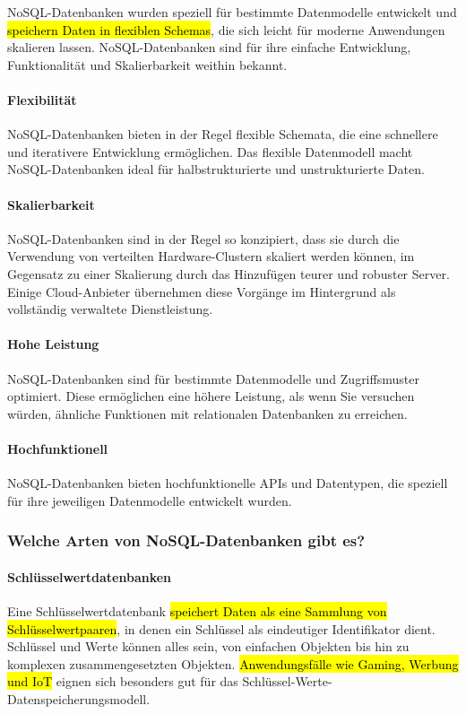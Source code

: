 NoSQL-Datenbanken wurden speziell für bestimmte Datenmodelle entwickelt und \hl{speichern Daten in flexiblen Schemas}, die sich leicht für moderne Anwendungen skalieren lassen. NoSQL-Datenbanken sind für ihre einfache Entwicklung, Funktionalität und Skalierbarkeit weithin bekannt. \cite{AWSnoSQL}

\paragraph{Flexibilität} NoSQL-Datenbanken bieten in der Regel flexible Schemata, die eine schnellere und iterativere Entwicklung ermöglichen. Das flexible Datenmodell macht NoSQL-Datenbanken ideal für halbstrukturierte und unstrukturierte Daten.

\paragraph{Skalierbarkeit} NoSQL-Datenbanken sind in der Regel so konzipiert, dass sie durch die Verwendung von verteilten Hardware-Clustern skaliert werden können, im Gegensatz zu einer Skalierung durch das Hinzufügen teurer und robuster Server. Einige Cloud-Anbieter übernehmen diese Vorgänge im Hintergrund als vollständig verwaltete Dienstleistung.

\paragraph{Hohe Leistung} NoSQL-Datenbanken sind für bestimmte Datenmodelle und Zugriffsmuster optimiert. Diese ermöglichen eine höhere Leistung, als wenn Sie versuchen würden, ähnliche Funktionen mit relationalen Datenbanken zu erreichen.

\paragraph{Hochfunktionell} NoSQL-Datenbanken bieten hochfunktionelle APIs und Datentypen, die speziell für ihre jeweiligen Datenmodelle entwickelt wurden.

\subsubsection{Welche Arten von NoSQL-Datenbanken gibt es?}
\label{sec:ArtenNoSQL}

\paragraph{Schlüsselwertdatenbanken} Eine Schlüsselwertdatenbank \hl{speichert Daten als eine Sammlung von Schlüsselwertpaaren}, in denen ein Schlüssel als eindeutiger Identifikator dient. Schlüssel und Werte können alles sein, von einfachen Objekten bis hin zu komplexen zusammengesetzten Objekten. \hl{Anwendungsfälle wie Gaming, Werbung und IoT} eignen sich besonders gut für das Schlüssel-Werte-Datenspeicherungsmodell. 

